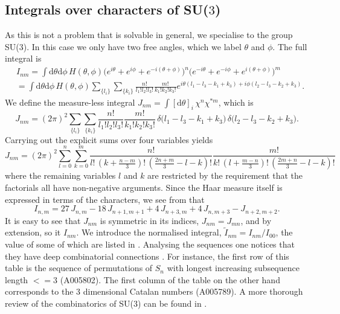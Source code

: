 \subsection{Integrals over characters of SU\texorpdfstring{($3$)}{(3)}}

As this is not a problem that is solvable in general, we specialise to the group
SU($3$). In this case we only have two free angles, which we label $\theta$ and
$\phi$. The full integral is
%
\begin{align}
  &I_{nm} = \int \mathrm{d} \theta \mathrm{d} \phi \, H(\theta,\phi)
  \big(e^{i\theta} + e^{i\phi} + e^{-i(\theta + \phi)}\big)^n
  \big(e^{-i\theta} + e^{-i\phi} + e^{i(\theta + \phi)}\big)^m \nonumber\\
  &=\int \mathrm{d} \theta \mathrm{d} \phi \, H(\theta,\phi)
  \sum_{\{l_i\}} \sum_{\{k_i\}} \frac{n!}{l_1! l_2! l_3!} \frac{m!}{k_1! k_2!
    k_3!} e^{i \theta (l_1 - l_3 - k_1 + k_3) + i \phi (l_2 - l_3 - k_2 + k_3)}.
\end{align}
%
We define the measure-less integral $J_{nm} = \int [\mathrm{d} \theta]_i\,
\chi^n \chi^{*m}$, which is
%
\begin{equation}
  J_{nm} = (2\pi)^2 \sum_{\{l_i\}} \sum_{\{k_i\}}
    \frac{n!}{l_1! l_2! l_3!} \frac{m!}{k_1! k_2!k_3!}\,
    \delta\big(l_1 - l_3 - k_1 + k_3\big)\, \delta\big(l_2 - l_3 - k_2 + k_3\big).
\end{equation}
%
Carrying out the explicit sums over four variables yields
%
\begin{equation}
  J_{nm} = (2\pi)^2 \sum_{l = 0}^n \sum_{k = 0}^m
    \frac{n!}{l!\, (k + \frac{n-m}{3})!\,(\frac{2n+m}{3} - l - k)!}
    \frac{m!}{k!\, (l + \frac{m-n}{3})!\,(\frac{2m+n}{3} - l - k)!}
\end{equation}
%
where the remaining variables $l$ and $k$ are restricted by the requirement that
the factorials all have non-negative arguments. Since the Haar measure itself is
expressed in terms of the characters, we see from 
that
%
\begin{equation}
  I_{n,m} = 27\, J_{n,m} - 18\, J_{n+1,m+1} + 4\, J_{n+3,m} + 4\, J_{n,m+3} - J_{n+2,m+2}.
\end{equation}
%
It is easy to see that $J_{nm}$ is symmetric in its indices, $J_{nm} = J_{mn}$,
and by extension, so it $I_{nm}$. We introduce the normalised integral,
$\tilde{I}_{nm} = I_{nm} / I_{00}$, the value of some of which are listed in
. Analysing the sequences one notices that they
have deep combinatorial connections \citep{OEIS}. For instance, the first row of
this table is the sequence of permutations of $S_n$ with longest increasing
subsequence length $<=3$ (A005802). The first column of the table on the other
hand corresponds to the 3 dimensional Catalan numbers (A005789). A more thorough
review of the combinatorics of SU($3$) can be found in \citep{Unger:2014oga}.

